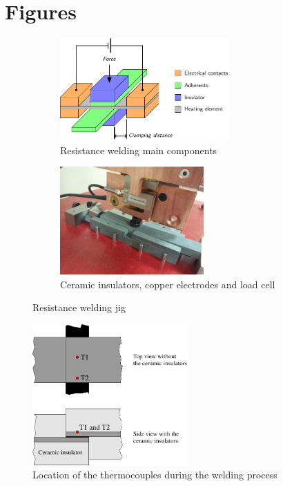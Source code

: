 \documentclass[11pt,review,times]{elsarticle}
\begin{document}
\pagebreak
							\section*{Figures}
\FloatBarrier


\begin{figure}[htb]
	\centering
	\captionsetup{width=125mm}
	\begin{subfigure}{65mm}
		\centering
		\captionsetup{width=65mm}
		\includegraphics[width=65mm]{beamer_IC3_DBrassard-figure1.pdf}
		\caption{Resistance welding main components \cite{Brassard2018_welding_schematic}}
		\label{fig:welding_jig_schematic}
	\end{subfigure}
	\begin{subfigure}{55mm}
		\centering
		\captionsetup{width=55mm}
		\includegraphics[width=55mm]{20161026_152818_resize.jpg}
		\caption{Ceramic insulators, copper electrodes and load cell}
		\label{fig:welding_jig_electrodes}
	\end{subfigure}%
	\caption{Resistance welding jig}
	\label{fig:welding_jig}
\end{figure}

\begin{figure}
		\center
		\captionsetup{width=60mm}
		\includegraphics[width=60mm]{thermocouple_welding}
		\caption{Location of the thermocouples during the welding process}
		\label{fig:location_thermocouple}
\end{figure} 
\end{document}
